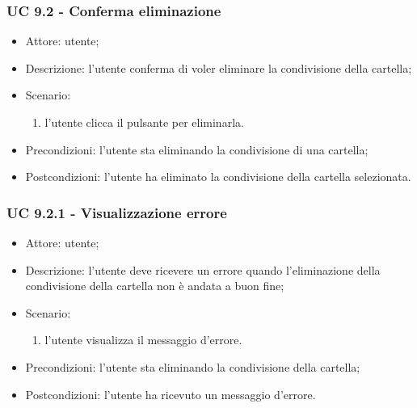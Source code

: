     \subsubsection{UC 9.2 - Conferma eliminazione}
    \begin{itemize}
        \item Attore: utente;
        \item Descrizione: l'utente conferma di voler eliminare la condivisione della cartella;
        \item Scenario:
        \begin{enumerate}
        \item l'utente clicca il pulsante per eliminarla.
        \end{enumerate}
        \item Precondizioni: l'utente sta eliminando la condivisione di una cartella;
        \item Postcondizioni: l'utente ha eliminato la condivisione della cartella selezionata.
    \end{itemize}

    \subsubsection{UC 9.2.1 - Visualizzazione errore }
    \begin{itemize}
        \item Attore: utente;
        \item Descrizione: l'utente deve ricevere un errore quando l'eliminazione della condivisione della cartella non è andata a buon fine;
        \item Scenario:
        \begin{enumerate}
        \item l'utente visualizza il messaggio d'errore.
        \end{enumerate}   
        \item Precondizioni: l'utente sta eliminando la condivisione della cartella;
        \item Postcondizioni: l'utente ha ricevuto un messaggio d'errore.
    \end{itemize}

